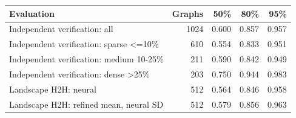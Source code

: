 \begin{tabular}{lrrrr}
\toprule
Evaluation & Graphs & 50\% & 80\% & 95\% \\
\midrule
Independent verification: all & 1024 & 0.600 & 0.857 & 0.957 \\
Independent verification: sparse <=10\% & 610 & 0.554 & 0.833 & 0.951 \\
Independent verification: medium 10-25\% & 211 & 0.590 & 0.842 & 0.949 \\
Independent verification: dense >25\% & 203 & 0.750 & 0.944 & 0.983 \\
Landscape H2H: neural & 512 & 0.564 & 0.846 & 0.958 \\
Landscape H2H: refined mean, neural SD & 512 & 0.579 & 0.856 & 0.963 \\
\bottomrule
\end{tabular}
